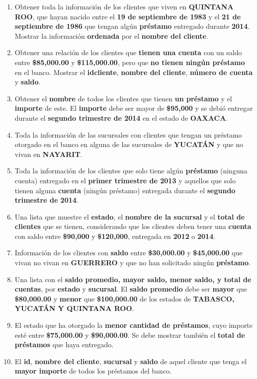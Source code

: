 \documentclass{exam}
\begin{document}
\begin{questions}
	\begin{enumerate}[label=\alph*.]
		\item Obtener toda la información de los clientes que viven en \textbf{QUINTANA ROO}, que hayan nacido entre el \textbf{19 de septiembre
de 1983} y el \textbf{21 de septiembre de 1986} que tengan algún \textbf{préstamo} entregado durante \textbf{2014}. Mostrar la información
\textbf{ordenada} por el \textbf{nombre del cliente}.
		\item Obtener una relación de los clientes que \textbf{tienen una cuenta} con un saldo entre \textbf{\$85,000.00} y \textbf{\$115,000.00}, pero que \textbf{no tienen ningún préstamo} en el banco. Mostrar el \textbf{idcliente}, \textbf{nombre del cliente}, \textbf{número de cuenta} y \textbf{saldo}.
		\item Obtener el \textbf{nombre} de todos los clientes que tienen \textbf{un préstamo} y el \textbf{importe} de este. El \textbf{importe} debe ser mayor de \textbf{\$95,000} y se debió entregar durante el \textbf{segundo trimestre de 2014} en el estado de \textbf{OAXACA}.
		\item Toda la información de las sucursales con clientes que tengan un préstamo otorgado en el banco en alguna de las sucursales de \textbf{YUCATÁN} y que no vivan en \textbf{NAYARIT}.
		\item Toda la información de los clientes que solo tiene algún \textbf{préstamo} (ninguna cuenta) entregado en el \textbf{primer trimestre de 2013} y aquellos que solo tienen alguna \textbf{cuenta} (ningún préstamo) entregada durante el \textbf{segundo trimestre de 2014}.
		\item Una lista que muestre el \textbf{estado}, el \textbf{nombre de la sucursal} y el \textbf{total de clientes} que se tienen, considerando que los clientes deben tener una \textbf{cuenta} con saldo entre \textbf{\$90,000} y \textbf{\$120,000}, entregada en \textbf{2012} o \textbf{2014}.
		\item Información de los clientes con \textbf{saldo} entre \textbf{\$30,000.00} y \textbf{\$45,000.00} que vivan no vivan en \textbf{GUERRERO} y que no han solicitado ningún \textbf{préstamo}.
		\item Una lista con el \textbf{saldo promedio, mayor saldo, menor saldo, y total de cuentas}, por \textbf{estado} y \textbf{sucursal}. El \textbf{saldo promedio} debe ser \textbf{mayor} que \textbf{\$80,000.00} y \textbf{menor} que \textbf{\$100,000.00} de los estados de \textbf{TABASCO, YUCATÁN Y QUINTANA ROO}.
		\item El estado que ha otorgado la \textbf{menor cantidad de préstamos}, cuyo importe esté entre \textbf{\$75,000.00} y \textbf{\$90,000.00}. Se debe mostrar también el \textbf{total de préstamos} que haya entregado.
		\item El \textbf{id}, \textbf{nombre del cliente}, \textbf{sucursal} y \textbf{saldo} de aquel cliente que tenga el \textbf{mayor importe} de todos los préstamos del
banco.
	\end{enumerate}
	

\end{questions}
\end{document}
